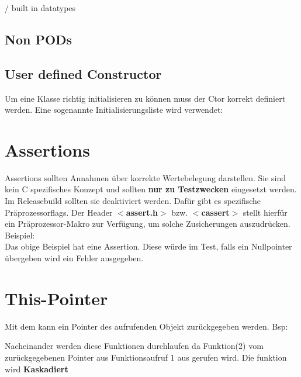  / built in datatypes



\subsection{Non PODs}



\nextcol

\subsection{User defined Constructor}

Um eine Klasse richtig initialisieren zu können muss der Ctor korrekt definiert werden. 
Eine sogenannte Initialisierungsliste wird verwendet:



\section{Assertions}

Assertions sollten Annahmen über korrekte Wertebelegung darstellen. 
Sie sind kein C spezifisches Konzept und sollten \textbf{nur zu Testzwecken} eingesetzt werden. 
Im Releasebuild sollten sie deaktiviert werden. 
Dafür gibt es spezifische Präprozessorflags.
Der Header \textbf{$<$assert.h$>$} bzw. \textbf{$<$cassert$>$} stellt hierfür ein Präprozessor-Makro  zur Verfügung, um solche Zusicherungen auszudrücken.\\
Beispiel:\\



Das obige Beispiel hat eine Assertion. 
Diese würde im Test, falls ein Nullpointer übergeben wird ein Fehler ausgegeben. 

\section{This-Pointer}

Mit dem  kann ein Pointer des aufrufenden Objekt zurückgegeben werden. Bsp:



Nacheinander werden diese Funktionen durchlaufen da Funktion(2) vom zurückgegebenen Pointer aus Funktionsaufruf 1 aus gerufen wird.
Die funktion wird \textbf{Kaskadiert}


